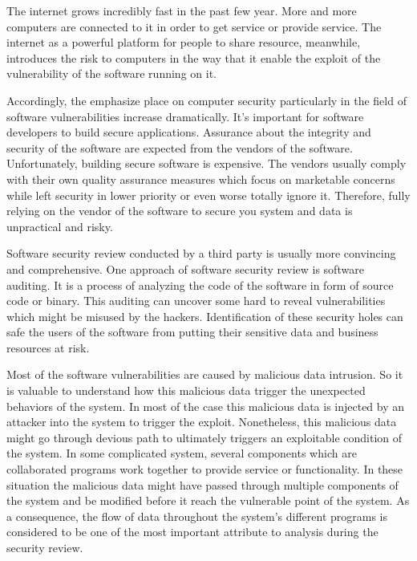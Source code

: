 \label{chapter:introduction}
The internet grows incredibly fast in the past few year. More and more computers are connected to it in order to get service or provide service. The internet as a powerful platform for people to share resource, meanwhile, introduces the risk to computers in the way that it enable the exploit of the vulnerability of the software running on it.

Accordingly, the emphasize place on computer security particularly in the field of software vulnerabilities increase dramatically. It's important for software developers to build secure applications. Assurance about the integrity and security of the software are expected from the vendors of the software. Unfortunately, building secure software is expensive. The vendors usually comply with their own quality assurance measures which focus on marketable concerns while left security in lower priority or even worse totally ignore it. Therefore, fully relying on the vendor of the software to secure you system and data is unpractical and risky.

Software security review conducted by a third party is usually more convincing and comprehensive. One approach of software security review is software auditing. It is a process of analyzing the code of the software in form of source code or binary. This auditing can uncover some hard to reveal vulnerabilities which might be misused by the hackers. Identification of these security holes can safe the users of the software from putting their sensitive data and business resources at risk.

Most of the software vulnerabilities are caused by malicious data intrusion. So it is valuable to understand how this malicious data trigger the unexpected behaviors of the system. In most of the case this malicious data is injected by an attacker into the system to trigger the exploit. Nonetheless, this malicious data might go through devious path to ultimately triggers an exploitable condition of the system. In some complicated system, several components which are collaborated programs work together to provide service or functionality. In these situation the malicious data might have passed through multiple components of the system and be modified before it reach the vulnerable point of the system. As a consequence, the flow of data throughout the system's different programs is considered to be one of the most important attribute to analysis during the security review.\cite{dowd_art_2006}

